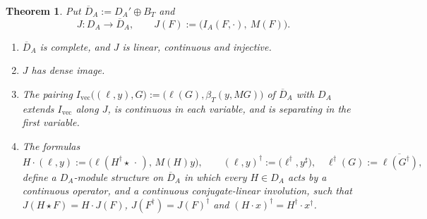 \documentclass[11pt]{amsart}
\newtheorem{theorem}{Theorem}[section]
\theoremstyle{definition}
\theoremstyle{remark}
\newcommand{\DA}{D_A}
\newcommand{\BT}{B_T}
\newcommand{\NAd}{\overline{D}_A}
\begin{document}
\begin{theorem}\label{thm:completion}
Put $\NAd:=\DA'\oplus\BT$ and
\begin{equation}\label{eq:J}
J:\DA\longrightarrow\NAd,\qquad
J(F):=\bigl(I_A(F,\cdot),\ M(F)\bigr).
\end{equation}
\begin{enumerate}
\item[(a)] $\NAd$ is complete, and $J$ is linear, continuous and injective.
\item[(b)] $J$ has dense image.
\item[(c)] The pairing
$I_{\mathrm{vec}}\bigl((\ell,y),G\bigr):=\bigl(\ell(G),\beta_T(y,MG)\bigr)$
of $\NAd$ with $\DA$ extends $I_{\mathrm{vec}}$ along $J$, is continuous in
each variable, and is separating in the first variable.
\item[(d)] The formulas
\[
H\cdot(\ell,y):=\bigl(\ell(H^{\dagger}\star\,\cdot\,),\,M(H)y\bigr),\qquad
(\ell,y)^{\dagger}:=\bigl(\ell^{\dagger},y^{\sharp}\bigr),\quad
\ell^{\dagger}(G):=\overline{\ell(G^{\dagger})},
\]
define a $\DA$-module structure on $\NAd$ in which every $H\in\DA$ acts by a
continuous operator, and a continuous conjugate-linear involution, such that
$J(H\star F)=H\cdot J(F)$, $J(F^{\dagger})=J(F)^{\dagger}$ and
$(H\cdot x)^{\dagger}=H^{\dagger}\cdot x^{\dagger}$.
\end{enumerate}
\end{theorem}
\end{document}
